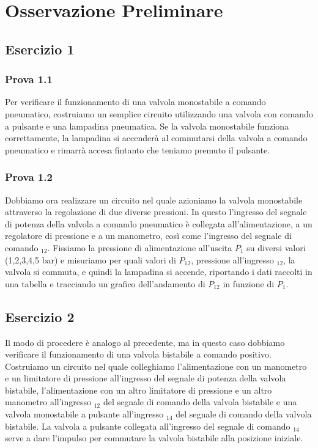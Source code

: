 \documentclass[a4paper]{article}
\begin{document}
\section{Osservazione Preliminare}
\subsection{Esercizio 1}
\subsubsection{Prova 1.1}
Per verificare il funzionamento di una valvola monostabile a comando pneumatico, costruiamo un semplice circuito utilizzando una valvola con comando a pulsante e una lampadina pneumatica. Se la valvola monostabile funziona correttamente, la lampadina si accenderà al commutarsi della valvola a comando pneumatico e rimarrà accesa fintanto che teniamo premuto il pulsante.

\subsubsection{Prova 1.2}
Dobbiamo ora realizzare un circuito nel quale azioniamo la valvola monostabile attraverso la regolazione di due diverse pressioni. In questo l’ingresso del segnale di potenza della valvola a comando pneumatico è collegata all'alimentazione, a un regolatore di pressione e a un manometro, così come l'ingresso del segnale di comando $_{12}$. Fissiamo la pressione di alimentazione all'uscita $P_1$ su diversi valori (1,2,3,4,5 bar) e misuriamo per quali valori di $P_{12}$, pressione all'ingresso $_{12}$, la valvola si commuta, e quindi la lampadina si accende, riportando i dati raccolti in una tabella e tracciando un grafico dell'andamento di $P_{12}$ in funzione di $P_1$.


\subsection{Esercizio 2}
Il modo di procedere è analogo al precedente, ma in questo caso dobbiamo verificare il funzionamento di una valvola bistabile a comando positivo. Costruiamo un circuito nel quale colleghiamo l'alimentazione con un manometro e un limitatore di pressione all’ingresso del segnale di potenza della valvola bistabile, l'alimentazione con un altro limitatore di pressione e un altro manometro all’ingresso $_{12}$ del segnale di comando della valvola bistabile e una valvola monostabile a pulsante all’ingresso $_{14}$ del segnale di comando della valvola bistabile. La valvola a pulsante collegata all’ingresso del segnale di comando $_{14}$ serve a dare l’impulso per commutare la valvola bistabile alla posizione iniziale.
\end{document}
